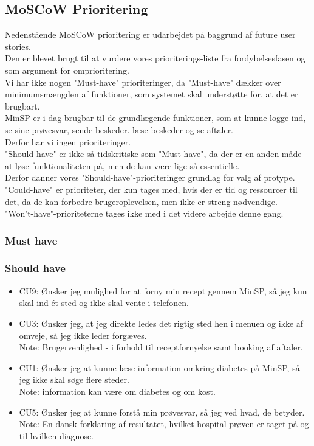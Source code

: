 \subsection{MoSCoW Prioritering}
Nedenstående MoSCoW prioritering er udarbejdet på baggrund af future user stories.\\
Den er blevet brugt til at vurdere vores prioriterings-liste fra fordybelsesfasen og som argument for omprioritering.\\
Vi har ikke nogen "Must-have" prioriteringer, da "Must-have" dækker over minimumsmængden af funktioner, som systemet skal understøtte for, at det er brugbart.\\
MinSP er i dag brugbar til de grundlægende funktioner, som at kunne logge ind, se sine prøvesvar, sende beskeder. læse beskeder og se aftaler. \\
Derfor har vi ingen prioriteringer.\\
"Should-have" er ikke så tidskritiske som "Must-have", da der er en anden måde at løse funktionaliteten på, men de kan være lige så essentielle.\\
Derfor danner vores "Should-have"-prioriteringer grundlag for valg af protype.\\
"Could-have" er prioriteter, der kun tages med, hvis der er tid og ressourcer til det, da de kan forbedre brugeroplevelsen, men ikke er streng nødvendige. \\
"Won't-have"-prioriteterne tages ikke med i det videre arbejde denne gang.
\subsubsection*{Must have}
\subsubsection*{Should have}
\begin{itemize}
\item CU9: Ønsker jeg mulighed for at forny min recept gennem MinSP, så jeg kun skal ind ét sted og ikke skal vente i telefonen.
\item CU3: Ønsker jeg, at jeg direkte ledes det rigtig sted hen i menuen og ikke af omveje, så jeg ikke leder forgæves. \\
Note: Brugervenlighed - i forhold til receptfornyelse samt booking af aftaler.
\item CU1: Ønsker jeg at kunne læse information omkring diabetes på MinSP, så jeg ikke skal søge flere steder. \\
Note: information kan være om diabetes og om kost.
\item CU5: Ønsker jeg at kunne forstå min prøvesvar, så jeg ved hvad, de betyder. \\
Note: En dansk forklaring af resultatet, hvilket hospital prøven er taget på og til hvilken diagnose.
\end{itemize}
